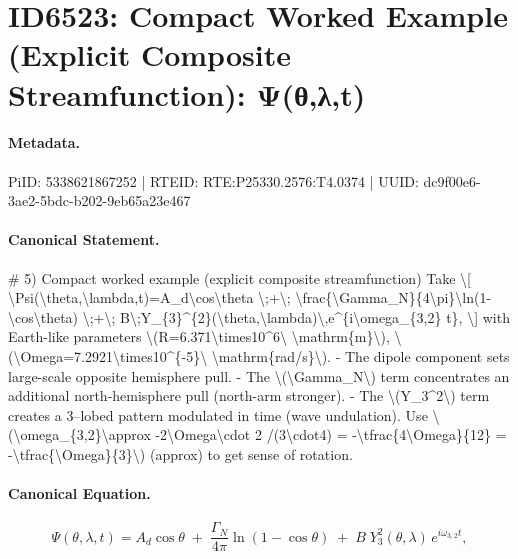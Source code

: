 \section*{ID6523: Compact Worked Example (Explicit Composite Streamfunction): Ψ(θ,λ,t)}
\paragraph{Metadata.}
PiID: 5338621867252 | RTEID: RTE:P25330.2576:T4.0374 | UUID: dc9f00e6-3ae2-5bdc-b202-9eb65a23e467

\paragraph{Canonical Statement.}
\# 5) Compact worked example (explicit composite streamfunction) Take \textbackslash{}[ \textbackslash{}Psi(\textbackslash{}theta,\textbackslash{}lambda,t)=A\_d\textbackslash{}cos\textbackslash{}theta \textbackslash{};+\textbackslash{}; \textbackslash{}frac\{\textbackslash{}Gamma\_N\}\{4\textbackslash{}pi\}\textbackslash{}ln(1-\textbackslash{}cos\textbackslash{}theta) \textbackslash{};+\textbackslash{}; B\textbackslash{};Y\_\{3\}\textasciicircum{}\{2\}(\textbackslash{}theta,\textbackslash{}lambda)\textbackslash{},e\textasciicircum{}\{i\textbackslash{}omega\_\{3,2\} t\}, \textbackslash{}] with Earth-like parameters \textbackslash{}(R=6.371\textbackslash{}times10\textasciicircum{}6\textbackslash{} \textbackslash{}mathrm\{m\}\textbackslash{}), \textbackslash{}(\textbackslash{}Omega=7.2921\textbackslash{}times10\textasciicircum{}\{-5\}\textbackslash{} \textbackslash{}mathrm\{rad/s\}\textbackslash{}). - The dipole component sets large-scale opposite hemisphere pull. - The \textbackslash{}(\textbackslash{}Gamma\_N\textbackslash{}) term concentrates an additional north-hemisphere pull (north-arm stronger). - The \textbackslash{}(Y\_3\textasciicircum{}2\textbackslash{}) term creates a 3–lobed pattern modulated in time (wave undulation). Use \textbackslash{}(\textbackslash{}omega\_\{3,2\}\textbackslash{}approx -2\textbackslash{}Omega\textbackslash{}cdot 2 /(3\textbackslash{}cdot4) = -\textbackslash{}tfrac\{4\textbackslash{}Omega\}\{12\} = -\textbackslash{}tfrac\{\textbackslash{}Omega\}\{3\}\textbackslash{}) (approx) to get sense of rotation.

\paragraph{Canonical Equation.}
\[
\Psi(\theta,\lambda,t)=A_d\cos\theta \;+\; \frac{\Gamma_N}{4\pi}\ln(1-\cos\theta) \;+\; B\;Y_{3}^{2}(\theta,\lambda)\,e^{i\omega_{3,2} t},
\]

